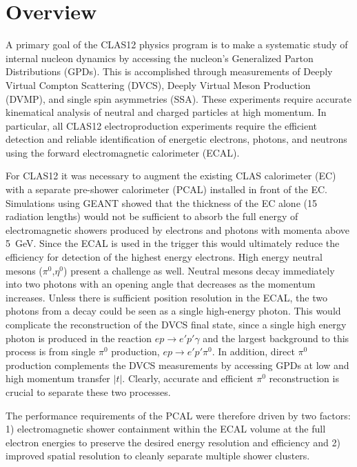 \section{Overview}

A primary goal of the CLAS12 physics program is to make a systematic study of internal nucleon dynamics by
accessing the nucleon's Generalized Parton Distributions (GPDs). This is accomplished through measurements of
Deeply Virtual Compton Scattering (DVCS), Deeply Virtual Meson Production (DVMP), and single spin asymmetries
(SSA). These experiments require accurate kinematical analysis of neutral and charged particles at high momentum.
In particular, all CLAS12 electroproduction experiments require the efficient detection and reliable identification
of energetic electrons, photons, and neutrons using the forward electromagnetic calorimeter (ECAL).

For CLAS12 it was necessary to augment the existing CLAS calorimeter (EC)~\cite{clas6nim} with a separate
pre-shower calorimeter (PCAL) installed in front of the EC. Simulations using GEANT showed that the thickness
of the EC alone (15 radiation lengths) would not be sufficient to absorb the full energy of electromagnetic showers
produced by electrons and photons with momenta above 5~GeV. Since the ECAL is used in the trigger this would
ultimately reduce the efficiency for detection of the highest energy electrons. High energy neutral mesons
($\pi^{0}$,$\eta^{0}$) present a challenge as well. Neutral mesons decay immediately into two photons with an
opening angle that decreases as the momentum increases. Unless there is sufficient position resolution in the ECAL,
the two photons from a decay could be seen as a single high-energy photon. This would complicate the reconstruction
of the DVCS final state, since a single high energy photon is produced in the reaction $ep \to e'p'\gamma$ and the
largest background to this process is from single $\pi^{0}$ production, $ep \to e'p'\pi^{0}$. In addition, direct
$\pi^{0}$ production complements the DVCS measurements by accessing GPDs at low and high momentum transfer
$|t|$. Clearly, accurate and efficient $\pi^{0}$ reconstruction is crucial to separate these two processes. 

The performance requirements of the PCAL were therefore driven by two factors: 1) electromagnetic shower
containment within the ECAL volume at the full electron energies to preserve the desired energy resolution and
efficiency and 2) improved spatial resolution to cleanly separate multiple shower clusters.  




